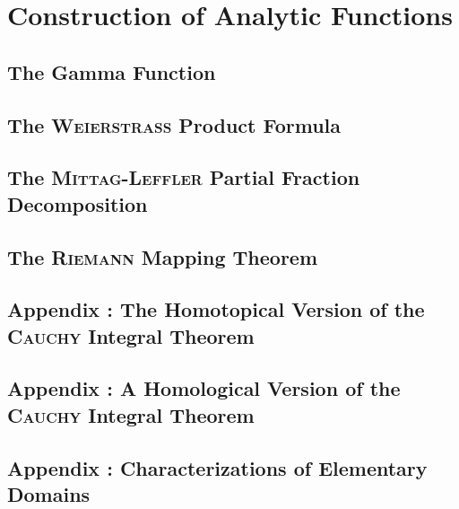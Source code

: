 \chapter{Construction of Analytic Functions}

\section{The Gamma Function}

\section{The \textsc{Weierstrass} Product Formula}

\section{The \textsc{Mittag-Leffler} Partial Fraction Decomposition}

\section{The \textsc{Riemann} Mapping Theorem}

\begin{subappendices}

\section{Appendix : The Homotopical Version of the \textsc{Cauchy} Integral Theorem}

\section{Appendix : A Homological Version of the \textsc{Cauchy} Integral Theorem}

\section{Appendix : Characterizations of Elementary Domains}

\end{subappendices}
